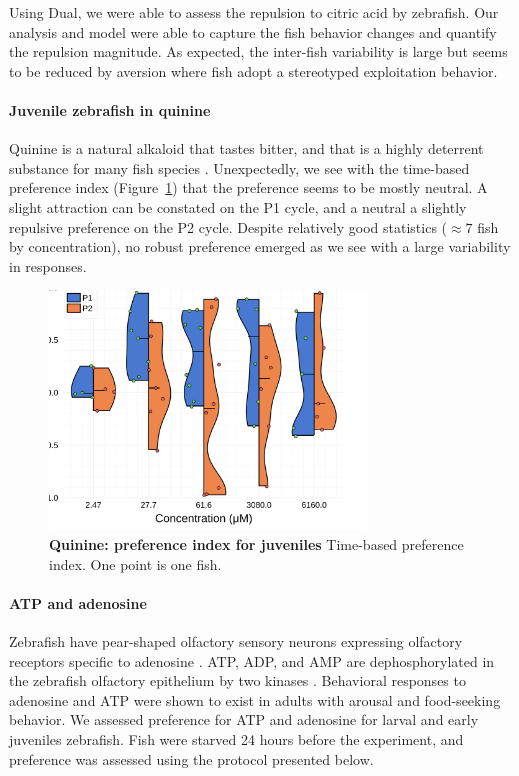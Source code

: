  Using Dual, we were able to assess the repulsion to citric acid by zebrafish. Our analysis and model were able to capture the fish behavior changes and quantify the repulsion magnitude. As expected, the inter-fish variability is large but seems to be reduced by aversion where fish adopt a stereotyped exploitation behavior.

    \paragraph{Juvenile zebrafish in quinine} Quinine is a natural alkaloid that tastes bitter, and that is a highly deterrent substance for many fish species \cite{kasumyan2003taste}. Unexpectedly, we see with the time-based preference index (Figure~\ref{dist_quinine}) that the preference seems to be mostly neutral. A slight attraction can be constated on the P1 cycle, and a neutral a slightly repulsive preference on the P2 cycle. Despite relatively good statistics ($\approx 7$ fish by concentration), no robust preference emerged as we see with a large variability in responses.

    \begin{figure}[h!]
      \centering
      \includegraphics[width=0.75\textwidth]{part_2/assets/dist_quinine.png}
      \caption{\textbf{Quinine: preference index for juveniles} Time-based preference index. One point is one fish. }
      \label{dist_quinine}
    \end{figure}

  \paragraph{ATP and adenosine}
  Zebrafish have pear-shaped olfactory sensory neurons expressing olfactory receptors specific to adenosine \cite{wakisaka2017adenosine}. ATP, ADP, and AMP are dephosphorylated in the zebrafish olfactory epithelium by two kinases \cite{wakisaka2017adenosine}. Behavioral responses to adenosine and ATP were shown to exist in adults with arousal and food-seeking behavior. We assessed preference for ATP and adenosine for larval and early juveniles zebrafish. Fish were starved 24 hours before the experiment, and preference was assessed using the protocol presented below.

